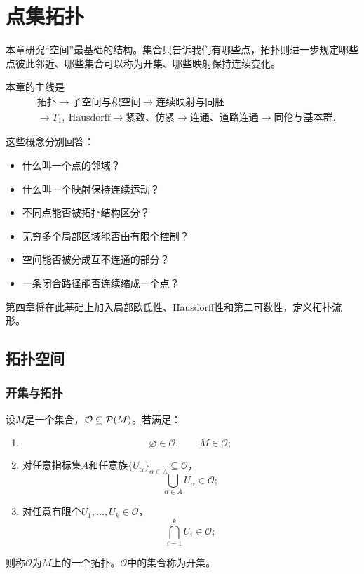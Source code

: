 \chapter{点集拓扑}
\label{chap:md-03}


本章研究“空间”最基础的结构。集合只告诉我们有哪些点，拓扑则进一步规定哪些点彼此邻近、哪些集合可以称为开集、哪些映射保持连续变化。

本章的主线是
\[
\begin{aligned}
&\text{拓扑}
\longrightarrow
\text{子空间与积空间}
\longrightarrow
\text{连续映射与同胚}\\
&\longrightarrow
T_1,\ \text{Hausdorff}
\longrightarrow
\text{紧致、仿紧}
\longrightarrow
\text{连通、道路连通}
\longrightarrow
\text{同伦与基本群}.
\end{aligned}
\]

这些概念分别回答：

\begin{itemize}
    \item 什么叫一个点的邻域？
    \item 什么叫一个映射保持连续运动？
    \item 不同点能否被拓扑结构区分？
    \item 无穷多个局部区域能否由有限个控制？
    \item 空间能否被分成互不连通的部分？
    \item 一条闭合路径能否连续缩成一个点？
\end{itemize}

第四章将在此基础上加入局部欧氏性、Hausdorff性和第二可数性，定义拓扑流形。


\section{拓扑空间}

\subsection{开集与拓扑}

\begin{definition}[拓扑]
设$M$是一个集合，$\mathcal O\subseteq\P(M)$。若满足：
\begin{enumerate}
    \item
    \[
        \varnothing\in\mathcal O,\qquad M\in\mathcal O;
    \]
    \item 对任意指标集$A$和任意族$\{U_\alpha\}_{\alpha\in A}\subseteq\mathcal O$，
    \[
        \bigcup_{\alpha\in A}U_\alpha\in\mathcal O;
    \]
    \item 对任意有限个$U_1,\ldots,U_k\in\mathcal O$，
    \[
        \bigcap_{i=1}^kU_i\in\mathcal O;
    \]
\end{enumerate}
则称$\mathcal O$为$M$上的一个拓扑。$\mathcal O$中的集合称为开集。
\end{definition}

